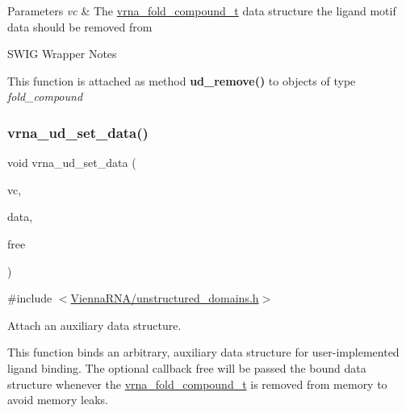 \begin{DoxyParams}{Parameters}
{\em vc} & The \hyperlink{group__fold__compound_ga1b0cef17fd40466cef5968eaeeff6166}{vrna\+\_\+fold\+\_\+compound\+\_\+t} data structure the ligand motif data should be removed from\\
\hline
\end{DoxyParams}
\begin{DoxyRefDesc}{S\+W\+I\+G Wrapper Notes}
\item[\hyperlink{wrappers__wrappers000069}{S\+W\+I\+G Wrapper Notes}]This function is attached as method {\bfseries ud\+\_\+remove()} to objects of type {\itshape fold\+\_\+compound} \end{DoxyRefDesc}
\mbox{\label{group__domains__up_gac1f18c312b91d80089534a87d956e58b}} 
\subsubsection{\texorpdfstring{vrna\+\_\+ud\+\_\+set\+\_\+data()}{vrna\_ud\_set\_data()}}
{\footnotesize\ttfamily void vrna\+\_\+ud\+\_\+set\+\_\+data (\begin{DoxyParamCaption}\item[{\hyperlink{group__fold__compound_ga1b0cef17fd40466cef5968eaeeff6166}{vrna\+\_\+fold\+\_\+compound\+\_\+t} $\ast$}]{vc,  }\item[{void $\ast$}]{data,  }\item[{\hyperlink{group__fold__compound_ga7806651f51b195013839a218b3bbd5a3}{vrna\+\_\+callback\+\_\+free\+\_\+auxdata} $\ast$}]{free }\end{DoxyParamCaption})}



{\ttfamily \#include $<$\hyperlink{unstructured__domains_8h}{Vienna\+R\+N\+A/unstructured\+\_\+domains.\+h}$>$}



Attach an auxiliary data structure. 

This function binds an arbitrary, auxiliary data structure for user-\/implemented ligand binding. The optional callback {\ttfamily free} will be passed the bound data structure whenever the \hyperlink{group__fold__compound_ga1b0cef17fd40466cef5968eaeeff6166}{vrna\+\_\+fold\+\_\+compound\+\_\+t} is removed from memory to avoid memory leaks.

